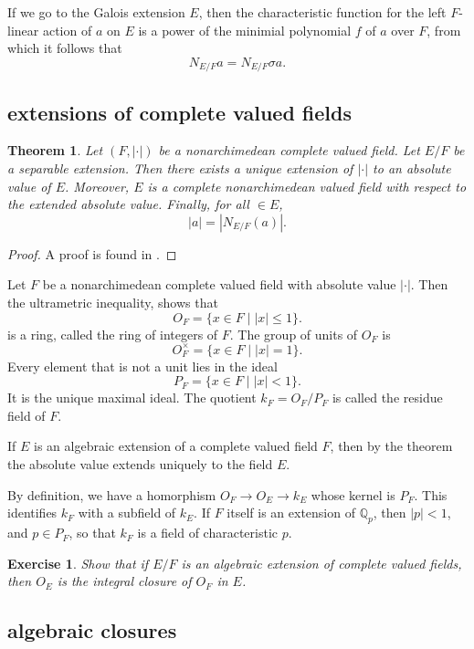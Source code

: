 \documentclass{amsart}
\newcommand{\ring}[1]{\mathbb{#1}}
\newtheorem{theorem}[equation]{Theorem}
\newtheorem{exercise}{Exercise}
\def\abs#1{{|#1|}}
\begin{document}
If we go to the Galois extension $E$, then the characteristic function
for the left $F$-linear action of $a$ on $E$ is a power of the minimial
polynomial $f$ of $a$ over $F$, from which it follows that
\[
N_{E/F}a = N_{E/F} \sigma a.
\]


\subsection{extensions of complete valued fields}



\begin{theorem}  Let $(F,\abs{\cdot})$ be a nonarchimedean complete valued field.  Let $E/F$
be a separable extension.  Then there exists a unique extension of $\abs{\cdot}$
to an absolute value of $E$.  Moreover, $E$ is a complete nonarchimedean valued field with
respect to the extended absolute value. Finally,
for all $\in E$, 
\[
\abs{a} = \abs{N_{E/F}(a)}.
\]
\end{theorem}

\begin{proof}  A proof is found in \cite[6.33]{knapp-advanced}.
\end{proof}


Let $F$ be a nonarchimedean complete valued field with absolute value $\abs{\cdot}$.
Then the ultrametric inequality, shows that
\[
O_F = \{x\in F \mid \abs{x}\le 1\}.
\]
is a ring, called the ring of integers of $F$.  
The group of units of $O_F$ is
\[
O^\times_F = \{x \in F \mid \abs{x}=1\}.
\]
Every element that is not a unit lies in the ideal
\[
P_F = \{x \in F \mid \abs{x}<1\}.
\]
It is the unique maximal ideal.  The quotient
$k_F = O_F/P_F$ is called the residue field of $F$.

If $E$ is an algebraic extension of a complete valued field $F$, 
then by the theorem the absolute
value extends uniquely to the field $E$.

By definition, we have a homorphism
$O_F \to O_E \to k_E$
whose kernel is $P_F$.  This identifies $k_F$ with a subfield of $k_E$.
If  $F$ itself is an extension of $\ring{Q}_p$, then $\abs{p}<1$, and $p\in P_F$,
so that $k_F$ is a field of  characteristic $p$.

\begin{exercise} Show that if $E/F$ is an algebraic extension of
  complete valued fields, then $O_E$ is the integral closure of $O_F$
  in $E$.
\end{exercise}

\subsection{algebraic closures}
\end{document}
